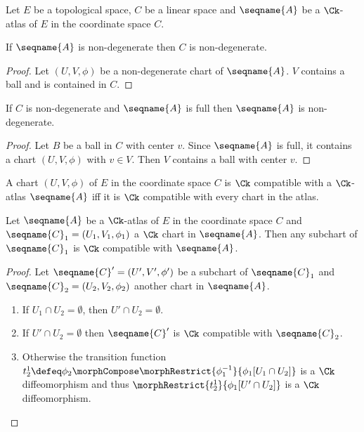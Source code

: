 \documentclass{article}
\begin{document}
\begin{lemma}
\label{lem:Ck-atlas}
Let $E$ be a topological space, $C$ be a linear space and $\seqname{A}$
be a $\Ck$-atlas of $E$ in the coordinate space $C$.

If $\seqname{A}$ is non-degenerate then $C$ is non-degenerate.

\begin{proof}
Let $(U,V,\phi)$ be a non-degenerate chart of $\seqname{A}$. $V$
contains a ball and is contained in $C$.
\end{proof}

If $C$ is non-degenerate and $\seqname{A}$ is full then $\seqname{A}$ is
non-degenerate.

\begin{proof}
Let $B$ be a ball in $C$ with center $v$. Since $\seqname{A}$ is full,
it contains a chart $(U,V,\phi)$ with $v \in V$. Then $V$ contains a
ball with center $v$.
\end{proof}
\end{lemma}

\begin{definition}
\label{def:CkCompat}
A chart $(U, V, \phi)$ of $E$ in the coordinate space $C$ is $\Ck$
compatible with a $\Ck$-atlas $\seqname{A}$ iff it is $\Ck$ compatible with
every chart in the atlas.
\end{definition}

\begin{lemma}
\label{lem:CkCompat}
Let $\seqname{A}$ be a $\Ck$-atlas of $E$ in the coordinate space $C$
and $\seqname{C}_1 = (U_1, V_1, \phi_1)$ a $\Ck$ chart in
$\seqname{A}$. Then any subchart of $\seqname{C}_1$ is $\Ck$ compatible
with $\seqname{A}$.

\begin{proof}
Let $\seqname{C}' = (U', V', \phi')$ be a subchart of $\seqname{C}_1$ and
$\seqname{C}_2 = (U_2, V_2, \phi_2)$ another chart in $\seqname{A}$.
\begin{enumerate}
\item If $U_1 \cap U_2 = \emptyset$, then $U' \cap U_2 = \emptyset$.
\item If $U' \cap U_2 = \emptyset$ then $\seqname{C}'$ is $\Ck$
compatible with $\seqname{C}_2$.
\item Otherwise the transition function
$t^1_2 \defeq \phi_2 \morphCompose \morphRestrict{\phi^{-1}_1}{\phi_1[U_1 \cap U_2]}$
is a $\Ck$ diffeomorphism and thus
$\morphRestrict{t^1_2}{\phi_1[U' \cap U_2]}$ is a $\Ck$ diffeomorphism.
\end{enumerate}
\end{proof}
\end{lemma}
\end{document}
